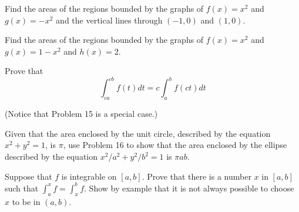 \documentclass[12pt,letterpaper]{hmcpset}
\begin{document}

\begin{problem}[8.ii]
Find the areas of the regions bounded by the graphs of $f(x) = x^2$ and $g(x)=-x^2$ and the vertical lines through $(-1,0)$ and $(1,0)$.	
\end{problem}

\begin{solution}

\end{solution}
\newpage

\begin{problem}[8.iv]
Find the areas of the regions bounded by the graphs of $f(x) = x^2$ and $g(x)=1-x^2$ and $h(x)=2$. 
\end{problem}

\begin{solution}

\end{solution}
\newpage
\begin{problem}[16]
Prove that 
\[ \int_{ca}^{cb} f(t) dt = c \int_{a}^{b} f(ct) dt \]

(Notice that Problem 15 is a special case.)
\end{problem}

\begin{solution}

\end{solution}
\newpage
\begin{problem}[17]
Given that the area enclosed by the unit circle, described by the equation $x^2+y^2=1$, is $\pi$, use Problem 16 to show that the area enclosed by the ellipse described by the equation $x^2/a^2+y^2/b^2 = 1$ is $\pi ab$.
\end{problem}

\begin{solution}

\end{solution}
\newpage
\begin{problem}[29]
Suppose that $f$ is integrable on $[a,b]$. Prove that there is a number $x$ in $[a,b]$ such that $\int_{a}^{x} f = \int_{x}^{b} f$. Show by example that it is not always possible to choose $x$ to be in $(a,b)$.

\end{problem}

\begin{solution}

\end{solution}
\end{document}
